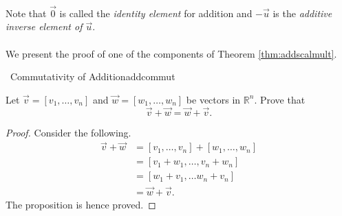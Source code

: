     \\
    Note that \(\vec{0}\) is called the \textit{identity element} for addition and \(-\vec{u}\) is the \textit{additive inverse element of \(\vec{u}\)}.
    \pagebreak
    \\
    \\
    We present the proof of one of the components of Theorem \ref{thm:addscalmult}.
    \begin{example}{\Difficulty\,\Difficulty\,\,Commutativity of Addition}{addcommut}

        Let \(\vec{v}=[v_1,\ldots,v_n]\) and \(\vec{w}=[w_1,\ldots,w_n]\) be vectors in \(\mathbb{R}^n\). Prove that
        \begin{equation*}
            \vec{v}+\vec{w}=\vec{w}+\vec{v}.
        \end{equation*}
        \begin{proof}
            Consider the following.
            \begin{align*}
                \vec{v}+\vec{w}&=[v_1,\ldots,v_n]+[w_1,\ldots,w_n] \\
                &=[v_1+w_1,\ldots,v_n+w_n] \\
                &=[w_1+v_1,\ldots w_n+v_n] \\
                &=\vec{w}+\vec{v}.
            \end{align*}
            The proposition is hence proved.
        \end{proof}

    
    \end{example}
